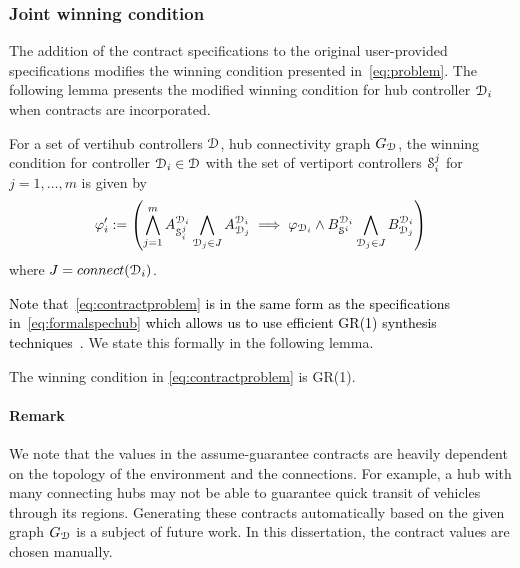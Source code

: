 \subsubsection{Joint winning condition}
The addition of the contract specifications to the original user-provided specifications modifies the winning condition presented in~\eqref{eq:problem}. The following lemma presents the modified winning condition for hub controller $\mathcal{D}_i$ when contracts are incorporated. 
\begin{lemma}
For a set of vertihub controllers $\mathcal{D}$, hub connectivity graph $G_{\mathcal{D}}$, the winning condition for controller $\mathcal{D}_i \in \mathcal{D}$ with the set of vertiport controllers $\mathcal{S}_i^j$ for $j = 1,\ldots,m$ is given by
\begin{equation}\label{eq:contractproblem}
     \varphi_{i}' := \left( \bigwedge_{j=1}^{m} A_{\mathcal{S}_i^j}^{\mathcal{D}_i} \bigwedge_{\mathcal{D}_j\in J} A_{\mathcal{D}_j}^{\mathcal{D}_i} \implies \varphi_{\mathcal{D}_i} \wedge B_{\mathcal{S}^i}^{\mathcal{D}_i} \bigwedge_{\mathcal{D}_j\in J} B_{\mathcal{D}_j}^{\mathcal{D}_i} \right)
\end{equation}
where $J = connect(\mathcal{D}_i)$.
\end{lemma}
\textcolor{black}{Note that~\eqref{eq:contractproblem} is in the same form as the specifications in~\eqref{eq:formalspechub} which allows us to use efficient GR(1) synthesis techniques~\cite{bloem2012}.} We state this formally in the following lemma. 
\begin{lemma}\label{lemma:gr1}
The winning condition in \eqref{eq:contractproblem} is GR(1).
\end{lemma}


\paragraph*{\textbf{Remark}} We note that the values in the assume-guarantee contracts are heavily dependent on the topology of the environment and the connections. For example, a hub with many connecting hubs may not be able to guarantee quick transit of vehicles through its regions. Generating these contracts automatically based on the given graph $G_{\mathcal{D}}$ is a subject of future work. In this dissertation, the contract values are chosen manually. 


